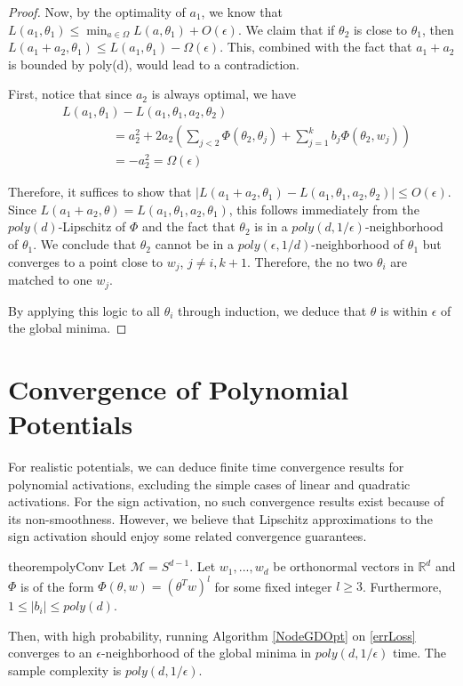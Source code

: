 \documentclass{article}
\newcommand{\R}{{\mathbb{R}}}
\begin{document}
\begin{proof}
Now, by the optimality of $a_1$, we know that $L(a_1,\theta_1) \leq \min_{a \in \Omega} L(a,\theta_1) + O(\epsilon)$. We claim that if $\theta_2$ is close to $\theta_1$, then $L(a_1+a_2,\theta_1) \leq L(a_1,\theta_1) - \Omega(\epsilon)$. This, combined with the fact that $a_1 + a_2$ is bounded by poly(d), would lead to a contradiction.

First, notice that since $a_2$ is always optimal, we have
\begin{align*}
& L(a_1,\theta_1) - L(a_1,\theta_1,a_2,\theta_2) \\
& \qquad \qquad = a_2^2 + 2a_2 (\sum_{j < 2} \Phi(\theta_2,\theta_j) + \sum_{j=1}^k b_j \Phi(\theta_2,w_j)) \\
& \qquad \qquad = -a_2^2 = \Omega(\epsilon)
\end{align*}

Therefore, it suffices to show that $|L(a_1+a_2,\theta_1) - L(a_1,\theta_1,a_2,\theta_2) | \leq O(\epsilon)$. Since $L(a_1+a_2,\theta) = L(a_1,\theta_1,a_2,\theta_1)$, this follows immediately from the $poly(d)$-Lipschitz of $\Phi$ and the fact that $\theta_2$ is in a $poly(d,1/\epsilon)$-neighborhood of $\theta_1$. We conclude that $\theta_2$ cannot be in a $poly(\epsilon,1/d)$-neighborhood of $\theta_1$ but converges to a point close to $w_{j}$, $j\neq i,k+1$. Therefore, the no two $\theta_i$ are matched to one $w_j$. 

By applying this logic to all $\theta_i$ through induction, we deduce that $\theta$ is within $\epsilon$ of the global minima.
\end{proof}


\section{Convergence of Polynomial Potentials}


For realistic potentials, we can deduce finite time convergence
results for polynomial activations, excluding the simple cases of
linear and quadratic activations. For the sign activation, no such
convergence results exist because of its non-smoothness. However, we
believe that Lipschitz approximations to the sign activation should
enjoy some related convergence guarantees.
%
\begin{restatable}{theorem}{polyConv}
\label{PolyConv}
Let $\mathcal{M} = S^{d-1}$. Let $w_1,...,w_d$ be orthonormal vectors in $\R^d$ and $\Phi$ is of the form $\Phi(\theta,w) = (\theta^Tw)^l$ for some fixed integer $l \geq 3$. Furthermore, $1 \leq |b_i|\leq poly(d)$. 

Then, with high probability, running Algorithm \ref{NodeGDOpt} on \eqref{errLoss} converges to an $\epsilon$-neighborhood of the global minima in $poly(d,1/\epsilon)$ time. The sample complexity is $poly(d,1/\epsilon)$.
\end{restatable}
\end{document}
